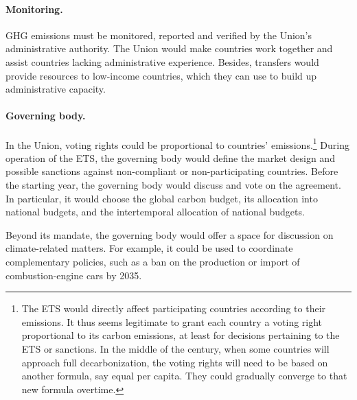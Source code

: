 \documentclass[12pt,english]{article}
\begin{document}
\paragraph{Monitoring.}
GHG emissions must be monitored, reported and verified by the Union's administrative authority. The Union would make countries work together and assist countries lacking administrative experience. Besides, transfers would provide resources to low-income countries, which they can use to build up administrative capacity. 

\paragraph{Governing body.} 
In the Union, voting rights could be proportional to countries' emissions.\footnote{The ETS would directly affect participating countries according to their emissions. It thus seems legitimate to grant each country a voting right proportional to its carbon emissions, at least for decisions pertaining to the ETS or sanctions. In the middle of the century, when some countries will approach full decarbonization, the voting rights will need to be based on another formula, say equal per capita. They could gradually converge to that new formula overtime. %
} %
During operation of the ETS, the governing body would define the market design and possible sanctions against non-compliant or non-participating countries.  %
Before the starting year, the governing body would discuss and vote on the agreement. In particular, it would choose the global carbon budget, its allocation into national budgets, and the intertemporal allocation of national budgets. 

Beyond its mandate, the governing body would offer a space for discussion on climate-related matters. For example, it could be used to coordinate complementary policies, such as a ban on the production or import of combustion-engine cars by 2035.
\end{document}
